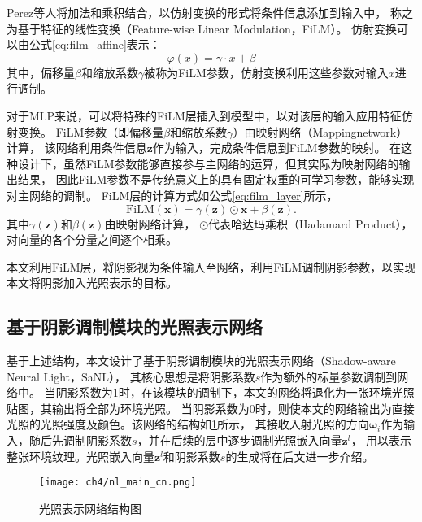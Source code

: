 Perez等人\cite{Perez_2018}将加法和乘积结合，以仿射变换的形式将条件信息添加到输入中，
称之为基于特征的线性变换（Feature-wise Linear Modulation，FiLM）。
仿射变换可以由公式\eqref{eq:film_affine}表示：
\begin{equation}
\label{eq:film_affine}
\varphi(x)=\gamma\cdot x+\beta
\end{equation}
其中，偏移量$\beta$和缩放系数$\gamma$被称为FiLM参数，仿射变换利用这些参数对输入$x$进行调制。

对于MLP来说，可以将特殊的FiLM层插入到模型中，以对该层的输入应用特征仿射变换。
FiLM参数（即偏移量$\beta$和缩放系数$\gamma$）由映射网络（Mappingnetwork）计算，
该网络利用条件信息$\boldsymbol{z}$作为输入，完成条件信息到FiLM参数的映射。
在这种设计下，虽然FiLM参数能够直接参与主网络的运算，但其实际为映射网络的输出结果，
因此FiLM参数不是传统意义上的具有固定权重的可学习参数，能够实现对主网络的调制。
FiLM层的计算方式如公式\eqref{eq:film_layer}所示，
\begin{equation}
\label{eq:film_layer}
\mathrm{FiLM}(\boldsymbol{x})=\gamma(\boldsymbol{z})\odot \boldsymbol{x}+\beta(\boldsymbol{z}).
\end{equation}
其中$\gamma(\boldsymbol{z})$和$\beta(\boldsymbol{z})$由映射网络计算，
$\odot$代表哈达玛乘积（Hadamard Product），对向量的各个分量之间逐个相乘。

本文利用FiLM层，将阴影视为条件输入至网络，利用FiLM调制阴影参数，以实现本文将阴影加入光照表示的目标。

\subsection{基于阴影调制模块的光照表示网络}

基于上述结构，本文设计了基于阴影调制模块的光照表示网络（Shadow-aware Neural Light，SaNL），
其核心思想是将阴影系数$s$作为额外的标量参数调制到网络中。
当阴影系数为1时，在该模块的调制下，本文的网络将退化为一张环境光照贴图，其输出将全部为环境光照。
当阴影系数为0时，则使本文的网络输出为直接光照的光照强度及颜色。该网络的结构如\ref{fig:nl_main_cn}所示，
其接收入射光照的方向${\boldsymbol{\omega}}_i$作为输入，随后先调制阴影系数$s$，并在后续的层中逐步调制光照嵌入向量${\boldsymbol{z}}^l$，
用以表示整张环境纹理。光照嵌入向量${\boldsymbol{z}}^l$和阴影系数$s$的生成将在后文进一步介绍。

\begin{figure}[htb]
  \centering
  \texttt{[image: ch4/nl\_main\_cn.png]}
  \caption{光照表示网络结构图}
  \label{fig:nl_main_cn}
\end{figure}


